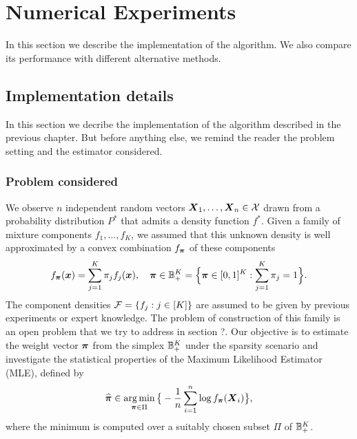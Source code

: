 
\chapter{Numerical Experiments}

In this section we describe the implementation of the algorithm. We also compare its performance with different alternative methods.

\section{Implementation details}

In this section we decribe the implementation of the algorithm described in the previous chapter. But before anything else, we remind the reader the problem setting and the estimator considered. 
\subsection{Problem considered}
We observe $n$ independent random vectors $\boldsymbol X_1,\ldots,\boldsymbol X_n\in\mathcal X$ drawn from a probability distribution $P^*$ that admits a density function $f^*$. Given a family of mixture components $f_1,\ldots,f_K$, we assumed that this unknown density is well approximated by a convex combination $f_{\boldsymbol \pi}$ of these components
\begin{equation}
f_{\boldsymbol \pi}(\boldsymbol x)=\sum_{j=1}^K\pi_j f_j(\boldsymbol x), \quad \boldsymbol \pi \in {\mathbb B}_+^K=\Big\{\boldsymbol \pi\in [0,1]^K: \sum_{j=1}^K\pi_j=1\Big\}.
\end{equation}
The component densities $\mathcal F=\{f_j:j\in[K]\}$ are assumed to be given by previous experiments or expert knowledge. The problem of construction of this family is an open problem that we try to address in section ?. Our objective is to estimate the weight vector $\boldsymbol \pi$ from the simplex ${\mathbb B}_+^K$ under the sparsity scenario and investigate the statistical properties of the Maximum Likelihood Estimator (MLE), defined by
\begin{equation}
\label{MLE_2}
\widehat{\boldsymbol \pi} \in \operatorname*{arg\,min}_{\boldsymbol \pi\in \Pi}\big\{-\frac{1}{n}\sum_{i=1}^n\log f_{\boldsymbol \pi}(\boldsymbol X_i)\big\},
\end{equation}
where the minimum is computed over a suitably chosen subset $\Pi$ of ${\mathbb B}_+^K$. 
